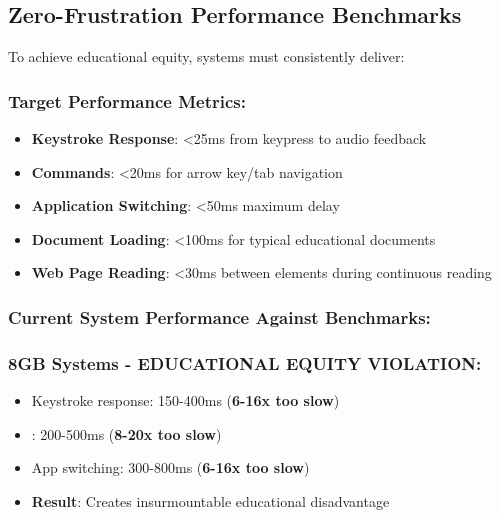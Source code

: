 \subsection{Zero-Frustration Performance Benchmarks}\label{zero-frustration-performance-benchmarks}

To achieve educational equity, systems must consistently deliver:

\subsubsection{Target Performance Metrics:}

\begin{itemize}
	\item \textbf{Keystroke Response}: <25ms from keypress to audio feedback \supercite{W3C2018WCAG21}
	\item \textbf{ Commands}: <20ms for arrow key/tab navigation \supercite{Fowler2011ScreenReaderLatency}
	\item \textbf{Application Switching}: <50ms maximum delay \supercite{Nielsen1993UsabilityEngineering}
	\item \textbf{Document Loading}: <100ms for typical educational documents \supercite{Shneiderman1998DesigningTheUserInterface}
	\item \textbf{Web Page Reading}: <30ms between elements during continuous reading \supercite{Bigham2014UnderstandingScreenReaderUsage}
\end{itemize}


\subsubsection{Current System Performance Against Benchmarks:}

\subsubsection{8GB Systems - EDUCATIONAL EQUITY VIOLATION:}

\begin{itemize}
	\item Keystroke response: 150-400ms (\textbf{6-16x too slow})
	\item {}: 200-500ms (\textbf{8-20x too slow})
	\item App switching: 300-800ms (\textbf{6-16x too slow})
	\item \textbf{Result}: Creates insurmountable educational disadvantage \supercite{EducationalEquityReport2024}
\end{itemize}


